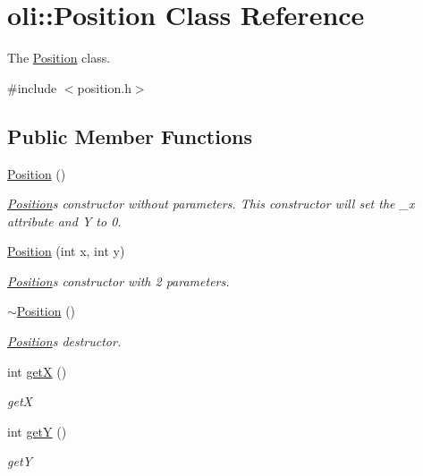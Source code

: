 \hypertarget{classoli_1_1_position}{}\section{oli\+:\+:Position Class Reference}
\label{classoli_1_1_position}


The \hyperlink{classoli_1_1_position}{Position} class.  




{\ttfamily \#include $<$position.\+h$>$}

\subsection*{Public Member Functions}
\begin{DoxyCompactItemize}
\item 
\hyperlink{classoli_1_1_position_ade4913282bb68eb3d5a95dd504ad374c}{Position} ()
\begin{DoxyCompactList}\small\item\em \hyperlink{classoli_1_1_position}{Position}\textquotesingle{}s constructor without parameters. This constructor will set the \+\_\+x attribute and Y to 0. \end{DoxyCompactList}\item 
\hyperlink{classoli_1_1_position_afcbdd002ad9be728dbfe4daecd745621}{Position} (int x, int y)
\begin{DoxyCompactList}\small\item\em \hyperlink{classoli_1_1_position}{Position}\textquotesingle{}s constructor with 2 parameters. \end{DoxyCompactList}\item 
\hyperlink{classoli_1_1_position_a30cbb2de832fec8a5619d600131a3aee}{$\sim$\+Position} ()
\begin{DoxyCompactList}\small\item\em \hyperlink{classoli_1_1_position}{Position}\textquotesingle{}s destructor. \end{DoxyCompactList}\item 
int \hyperlink{classoli_1_1_position_afe4474780d03f71339d059b7742ad6e8}{getX} ()
\begin{DoxyCompactList}\small\item\em getX \end{DoxyCompactList}\item 
int \hyperlink{classoli_1_1_position_a7c203441f6429fcbd5bf014576219c18}{getY} ()
\begin{DoxyCompactList}\small\item\em getY \end{DoxyCompactList}\end{DoxyCompactItemize}


